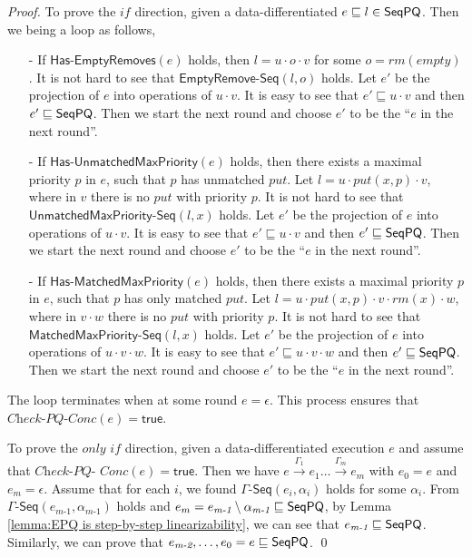 \begin {proof}

To prove the $\textit{if}$ direction, given a data-differentiated $e \sqsubseteq l \in \mathsf{SeqPQ}$. Then we being a loop as follows,

\begin{itemize}
\setlength{\itemsep}{0.5pt}
\item[-] If $\mathsf{Has\text{-}EmptyRemoves}(e)$ holds, then $l = u \cdot o \cdot v$ for some $o=\textit{rm}(\textit{empty})$. It is not hard to see that $\mathsf{EmptyRemove\text{-}Seq}(l,o)$ holds. Let $e'$ be the projection of $e$ into operations of $u \cdot v$. It is easy to see that $e' \sqsubseteq u \cdot v$ and then $e' \sqsubseteq \mathsf{SeqPQ}$. Then we start the next round and choose $e'$ to be the ``$e$ in the next round''.

\item[-] If $\mathsf{Has\text{-}UnmatchedMaxPriority}(e)$ holds, then there exists a maximal priority $p$ in $e$, such that $p$ has unmatched $\textit{put}$. Let $l = u \cdot \textit{put}(x,p) \cdot v$, where in $v$ there is no $\textit{put}$ with priority $p$. It is not hard to see that $\mathsf{UnmatchedMaxPriority\text{-}Seq}(l,x)$ holds. Let $e'$ be the projection of $e$ into operations of $u \cdot v$. It is easy to see that $e' \sqsubseteq u \cdot v$ and then $e' \sqsubseteq \mathsf{SeqPQ}$. Then we start the next round and choose $e'$ to be the ``$e$ in the next round''.

\item[-] If $\mathsf{Has\text{-}MatchedMaxPriority}(e)$ holds, then there exists a maximal priority $p$ in $e$, such that $p$ has only matched $\textit{put}$. Let $l = u \cdot \textit{put}(x,p) \cdot v \cdot \textit{rm}(x) \cdot w$, where in $v \cdot w$ there is no $\textit{put}$ with priority $p$. It is not hard to see that $\mathsf{MatchedMaxPriority\text{-}Seq}(l,x)$ holds. Let $e'$ be the projection of $e$ into operations of $u \cdot v \cdot w$. It is easy to see that $e' \sqsubseteq u \cdot v \cdot w$ and then $e' \sqsubseteq \mathsf{SeqPQ}$. Then we start the next round and choose $e'$ to be the ``$e$ in the next round''.
\end{itemize}

The loop terminates when at some round $e=\epsilon$. This process ensures that $\textit{Check-PQ-Conc}(e)=\mathsf{true}$.

To prove the $\textit{only if}$ direction, given a data-differentiated execution $e$ and assume that $\textit{Check-PQ-}$ $\textit{Conc}(e)=\mathsf{true}$. Then we have $e \xrightarrow{\Gamma_1} e_1 \ldots \xrightarrow{\Gamma_m} e_m$ with $e_0=e$ and $e_m=\epsilon$. Assume that for each $i$, we found $\mathsf{\Gamma\text{-}Seq}(e_i,\alpha_i)$ holds for some $\alpha_i$. From $\mathsf{\Gamma\text{-}Seq}(e_{\textit{m-1}},\alpha_{\textit{m-1}})$ holds and $e_m = e_{\textit{m-1}} \setminus \alpha_{\textit{m-1}} \sqsubseteq \mathsf{SeqPQ}$, by Lemma \ref{lemma:EPQ is step-by-step linearizability}, we can see that $e_{\textit{m-1}} \sqsubseteq \mathsf{SeqPQ}$. Similarly, we can prove that $e_{\textit{m-2}},\ldots,e_0=e \sqsubseteq \mathsf{SeqPQ}$. \qed
\end {proof}




